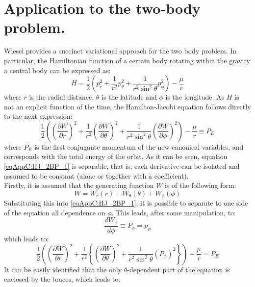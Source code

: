 \section{Application to the two-body problem.}
%
\indent Wiesel \cite{Wiesel} provides a succinct variational approach for the two body problem. In particular, the Hamiltonian function of a certain body rotating within the gravity a central body can be expressed as:
%
\begin{equation}
H = \dfrac{1}{2} \left( p_r^2 + \dfrac{1}{r^2} p_{\theta}^2 + \dfrac{1}{r^2 \sin^2 \theta} p_{\phi}^2 \right) - \dfrac{\mu}{r}
\label{eqAppC:Ham_2BP}
\end{equation}
%
\noindent where $r$ is the radial distance, $\theta$ is the latitude and $\phi$ is the longitude. As $H$ is not an explicit function of the time, the Hamilton-Jacobi equation follows directly to the next expression:
%
\begin{equation}
\dfrac{1}{2} \left( \left(\dfrac{\partial W}{\partial r}\right)^2 + \dfrac{1}{r^2} \left(\dfrac{\partial W}{\partial \theta}\right)^2 + \dfrac{1}{r^2 \sin^2 \theta} \left(\dfrac{\partial W}{\partial \phi}\right)^2 \right) - \dfrac{\mu}{r} \equiv P_E
\label{eqAppC:HJ_2BP_1}
\end{equation}
%
\noindent where $P_E$ is the first conjugante momentum of the new canonical variables, and corresponds with the total energy of the orbit. As it can be seen, equation \eqref{eqAppC:HJ_2BP_1} is separable, that is, each derivative can be isolated and assumed to be constant (alone or together with a coefficient). \\
%
\indent Firstly, it is assumed that the generating function $W$ is of the following form:
%
\[
W = W_r(r) + W_{\theta} (\theta) + W_{\phi} (\phi)
\]
%
\indent Substituting this into \eqref{eqAppC:HJ_2BP_1}, it is possible to separate to one side of the equation all dependence on $\phi$. This leads, after some manipulation, to:
%
\begin{equation}
\dfrac{dW_{\phi}}{d\phi} \equiv P_{\phi} = p_{\phi}
\end{equation}
%
\noindent which leads to:
%
\begin{equation}
\dfrac{1}{2} \left( \left(\dfrac{\partial W}{\partial r}\right)^2 + \dfrac{1}{r^2} \left\{\left(\dfrac{\partial W}{\partial \theta}\right)^2 + \dfrac{1}{r^2 \sin^2 \theta} \left(P_{\phi} \right)^2 \right\} \right)- \dfrac{\mu}{r} = P_E
\end{equation}
%
\indent It can be easily identified that the only $\theta$-dependent part of the equation is enclosed by the braces, which leads to:
